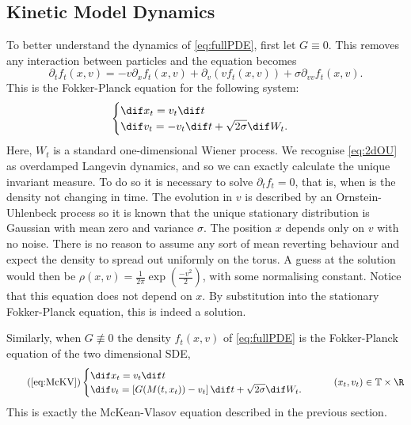       \subsection{Kinetic Model Dynamics}\label{sec:kindynamics}
      To better understand the dynamics of \eqref{eq:fullPDE}, first let $G\equiv0$. This removes any interaction between particles and the equation becomes
      \begin{equation}\label{eq:OUFPE}
      \partial_t f_t(x,v) = -v\partial_x f_t(x,v) +\partial_v\left( vf_t(x,v)\right) + \sigma \partial_{vv}f_t(x,v).
      \end{equation}
      This is the Fokker-Planck equation for the following system:
      \begin{equation}\label{eq:2dOU}\begin{cases}
      \dif x_t = v_t\dif t\\
      \dif v_t = -v_t\dif t + \sqrt{2\sigma} \dif W_t. 
      \end{cases}	\end{equation}
      Here, $W_t$ is a standard one-dimensional Wiener process. We recognise \eqref{eq:2dOU} as overdamped Langevin dynamics, and so we can exactly calculate the unique invariant measure. To do so it is necessary to solve $\partial_t f_t = 0$, that is, when is the density not changing in time. The evolution in $v$ is described by an Ornstein-Uhlenbeck process so it is known that the unique stationary distribution is Gaussian with mean zero and variance $\sigma$. The position $x$ depends only on $v$ with no noise. There is no reason to assume any sort of mean reverting behaviour and expect the density to spread out uniformly on the torus. A guess at the solution would then be $\rho (x,v) = \frac{1}{2\pi}\exp(\frac{-v^2}{2})$, with some normalising constant. Notice that this equation does not depend on $x$. By substitution into the stationary Fokker-Planck equation, this is indeed a solution.
      
      Similarly, when $G\not\equiv 0$ the density $f_t(x,v)$ of \eqref{eq:fullPDE} is the Fokker-Planck equation of the two dimensional SDE,
      \begin{equation}\tag{\ref{eq:McKV}}\begin{cases}
      \dif x_t = v_t\dif t\\
      \dif v_t = \left[G(M(t,x_t))-v_t\right] \dif t + \sqrt{2\sigma} \dif W_t. 
      \end{cases} \qquad  (x_t,v_t) \in \T \times \R
      \end{equation}
      This is exactly the McKean-Vlasov equation described in the previous section. 
